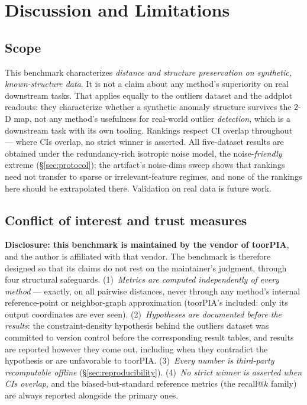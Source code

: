 \documentclass[11pt]{article}
\begin{document}
\section{Discussion and Limitations}
\label{sec:limitations}

\subsection{Scope}

This benchmark characterizes \emph{distance and structure preservation on
synthetic, known-structure data}. It is not a claim about any method's
superiority on real downstream tasks. That applies equally to the outliers
dataset and the addplot readouts: they characterize whether a synthetic
anomaly structure survives the 2-D map, not any method's usefulness for
real-world outlier \emph{detection}, which is a downstream task with its own
tooling. Rankings respect CI overlap throughout --- where CIs overlap, no
strict winner is asserted. All five-dataset results are obtained under the
redundancy-rich isotropic noise model, the noise-\emph{friendly} extreme
(\S\ref{sec:protocol}); the artifact's noise-dims sweep shows that rankings
need not transfer to sparse or irrelevant-feature regimes, and none of the
rankings here should be extrapolated there. Validation on real data is
future work.

\subsection{Conflict of interest and trust measures}

\textbf{Disclosure: this benchmark is maintained by the vendor of toorPIA},
and the author is affiliated with that vendor. The benchmark is therefore
designed so that its claims do not rest on the maintainer's judgment, through
four structural safeguards. (1)~\emph{Metrics are computed independently of
every method} --- exactly, on all pairwise distances, never through any
method's internal reference-point or neighbor-graph approximation (toorPIA's
included: only its output coordinates are ever seen). (2)~\emph{Hypotheses
are documented before the results}: the constraint-density hypothesis behind
the outliers dataset was committed to version control before the
corresponding result tables, and results are reported however they come out,
including when they contradict the hypothesis or are unfavorable to toorPIA.
(3)~\emph{Every number is third-party recomputable offline}
(\S\ref{sec:reproducibility}). (4)~\emph{No strict winner is asserted when
CIs overlap}, and the biased-but-standard reference metrics (the recall@$k$
family) are always reported alongside the primary ones.
\end{document}
